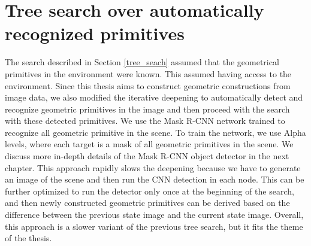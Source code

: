 \section{Tree search over automatically recognized primitives}
The search described in Section \ref{tree_seach} assumed that the geometrical primitives in the environment were known. This assumed having access to the environment. Since this thesis aims to construct geometric constructions from image data, we also modified the iterative deepening to automatically detect and recognize geometric primitives in the image and then proceed with the search with these detected primitives. We use the Mask {R-CNN} network trained to recognize all geometric primitive in the scene. To train the network, we use Alpha levels, where each target is a mask of all geometric primitives in the scene. We discuss more in-depth details of the Mask {R-CNN} object detector in the next chapter. This approach rapidly slows the deepening because we have to generate an image of the scene and then run the CNN detection in each node. This can be further optimized to run the detector only once at the beginning of the search, and then newly constructed geometric primitives can be derived based on the difference between the previous state image and the current state image. Overall, this approach is a slower variant of the previous tree search, but it fits the theme of the thesis.